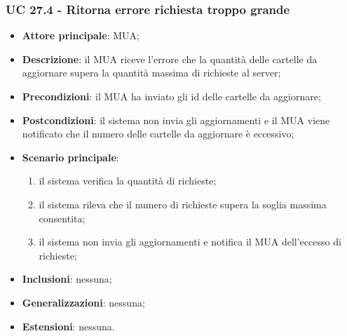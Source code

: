     \subsubsection{UC 27.4 - Ritorna errore richiesta troppo grande} \label{sec:UC27.4}
    \begin{itemize}
        \item \textbf{Attore principale}: MUA;
        \item \textbf{Descrizione}: il MUA riceve l'errore che la quantità delle cartelle da aggiornare supera la quantità massima di richieste al server;
        \item \textbf{Precondizioni}: il MUA ha inviato gli id delle cartelle da aggiornare;
        \item \textbf{Postcondizioni}: il sistema non invia gli aggiornamenti e il MUA viene notificato che il numero delle cartelle da aggiornare è eccessivo;
        \item \textbf{Scenario principale}:
            \begin{enumerate}
                \item il sistema verifica la quantità di richieste;
                \item il sistema rileva che il numero di richieste supera la soglia massima consentita;
                \item il sistema non invia gli aggiornamenti e notifica il MUA dell'eccesso di richieste;
            \end{enumerate}
        \item \textbf{Inclusioni}: nessuna;
        \item \textbf{Generalizzazioni}: nessuna;
        \item \textbf{Estensioni}: nessuna.
    \end{itemize}

